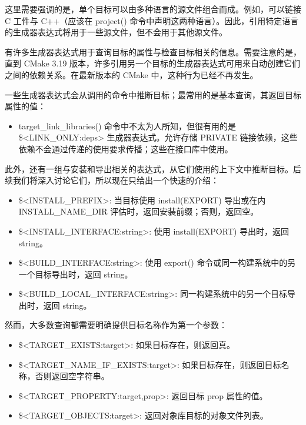 这里需要强调的是，单个目标可以由多种语言的源文件组合而成。例如，可以链接 C 工件与 C++（应该在 project() 命令中声明这两种语言）。因此，引用特定语言的生成器表达式将用于一些源文件，但不会用于其他源文件。


有许多生成器表达式用于查询目标的属性与检查目标相关的信息。需要注意的是，直到 CMake 3.19 版本，许多引用另一个目标的生成器表达式可用来自动创建它们之间的依赖关系。在最新版本的 CMake 中，这种行为已经不再发生。

一些生成器表达式会从调用的命令中推断目标；最常用的是基本查询，其返回目标属性的值：


\begin{itemize}
\item
target\_link\_libraries() 命令中不太为人所知，但很有用的是 \$<LINK\_ONLY:deps> 生成器表达式。允许存储 PRIVATE 链接依赖，这些依赖不会通过传递的使用要求传播；这些在接口库中使用。
\end{itemize}

此外，还有一组与安装和导出相关的表达式，从它们使用的上下文中推断目标。后续我们将深入讨论它们，所以现在只给出一个快速的介绍：

\begin{itemize}
\item
\$<INSTALL\_PREFIX>: 当目标使用 install(EXPORT) 导出或在内 INSTALL\_NAME\_DIR 评估时，返回安装前缀；否则，返回空。

\item
\$<INSTALL\_INTERFACE:string>: 使用 install(EXPORT) 导出时，返回 string。

\item
\$<BUILD\_INTERFACE:string>: 使用 export() 命令或同一构建系统中的另一个目标导出时，返回 string。

\item
\$<BUILD\_LOCAL\_INTERFACE:string>: 同一构建系统中的另一个目标导出时，返回 string。
\end{itemize}

然而，大多数查询都需要明确提供目标名称作为第一个参数：

\begin{itemize}
\item
\$<TARGET\_EXISTS:target>: 如果目标存在，则返回真。

\item
\$<TARGET\_NAME\_IF\_EXISTS:target>: 如果目标存在，则返回目标名称，否则返回空字符串。

\item
\$<TARGET\_PROPERTY:target,prop>: 返回目标 prop 属性的值。

\item
\$<TARGET\_OBJECTS:target>: 返回对象库目标的对象文件列表。
\end{itemize}

